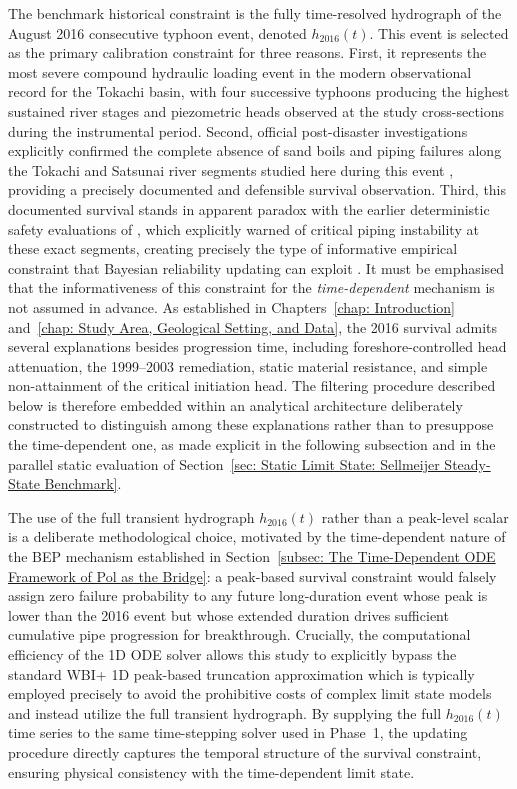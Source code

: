 The benchmark historical constraint is the fully time-resolved hydrograph of the August 2016 consecutive typhoon event, denoted $h_{2016}(t)$. This event is selected as the primary calibration constraint for three reasons. First, it represents the most severe compound hydraulic loading event in the modern observational record for the Tokachi basin, with four successive typhoons producing the highest sustained river stages and piezometric heads observed at the study cross-sections during the instrumental period. Second, official post-disaster investigations explicitly confirmed the complete absence of sand boils and piping failures along the Tokachi and Satsunai river segments studied here during this event \parencite{tokachi_levee_committee_2017}, providing a precisely documented and defensible survival observation. Third, this documented survival stands in apparent paradox with the earlier deterministic safety evaluations of \textcite{oyo_1999}, which explicitly warned of critical piping instability at these exact segments, creating precisely the type of informative empirical constraint that Bayesian reliability updating can exploit \parencite{schweckendiek_2014, hkv_2023}. It must be emphasised that the informativeness of this constraint for the \emph{time-dependent} mechanism is not assumed in advance. As established in Chapters~\ref{chap: Introduction} and~\ref{chap: Study Area, Geological Setting, and Data}, the 2016 survival admits several explanations besides progression time, including foreshore-controlled head attenuation, the 1999--2003 remediation, static material resistance, and simple non-attainment of the critical initiation head. The filtering procedure described below is therefore embedded within an analytical architecture deliberately constructed to distinguish among these explanations rather than to presuppose the time-dependent one, as made explicit in the following subsection and in the parallel static evaluation of Section~\ref{sec: Static Limit State: Sellmeijer Steady-State Benchmark}.

The use of the full transient hydrograph $h_{2016}(t)$ rather than a peak-level scalar is a deliberate methodological choice, motivated by the time-dependent nature of the BEP mechanism established in Section~\ref{subsec: The Time-Dependent ODE Framework of Pol as the Bridge}: a peak-based survival constraint would falsely assign zero failure probability to any future long-duration event whose peak is lower than the 2016 event but whose extended duration drives sufficient cumulative pipe progression for breakthrough. Crucially, the computational efficiency of the 1D ODE solver allows this study to explicitly bypass the standard WBI+ 1D peak-based truncation approximation which is typically employed precisely to avoid the prohibitive costs of complex limit state models and instead utilize the full transient hydrograph. By supplying the full $h_{2016}(t)$ time series to the same time-stepping solver used in Phase~1, the updating procedure directly captures the temporal structure of the survival constraint, ensuring physical consistency with the time-dependent limit state.

